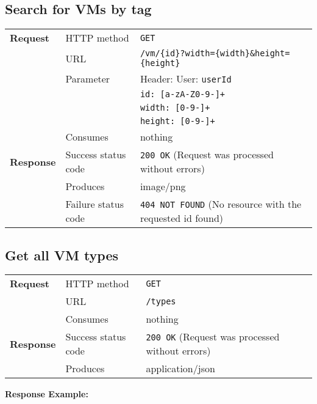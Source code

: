 \subsection{Search for VMs by tag} %

\begin{center}
	\begin{tabularx}{\textwidth}{llX} 
	    \toprule
					\textbf{Request}        &   HTTP method             &   \texttt{GET}			\tabularnewline
		                        			&   URL                     &   \texttt{/vm/\{id\}?width=\{width\}\&height=\{height\}}           	\tabularnewline
									& Parameter & Header: User: \texttt{userId} \tabularnewline
													& & \texttt{id: [a-zA-Z0-9-]+} \tabularnewline
													& & \texttt{width: [0-9-]+} \tabularnewline
													& & \texttt{height: [0-9-]+} \tabularnewline
                                  &   Consumes                &   nothing					      	\tabularnewline \midrule                       
          \textbf{Response}       &   Success status code     &   \texttt{200 OK} (Request was processed without errors) 	\tabularnewline
                                  &   Produces                &   image/png								\tabularnewline
                                  &   Failure status code     &   \texttt{404 NOT FOUND} (No resource with the requested id found)	\tabularnewline
           \bottomrule
	\end{tabularx}
\end{center}
\pagebreak[3] 	
\pagebreak[3]


\subsection{Get all VM types} %

\begin{center}
	\begin{tabularx}{\textwidth}{llX} 
	    \toprule
					\textbf{Request}        &   HTTP method             &   \texttt{GET}			\tabularnewline
		                        			&   URL                     &   \texttt{/types}           	\tabularnewline
                                  &   Consumes                &   nothing					      	\tabularnewline \midrule                       
          \textbf{Response}       &   Success status code     &   \texttt{200 OK} (Request was processed without errors) 	\tabularnewline
                                  &   Produces                &   application/json								\tabularnewline
           \bottomrule
	\end{tabularx}
\end{center}
\pagebreak[3] 	
\pagebreak[3]
		\textbf{Response Example:}
		




